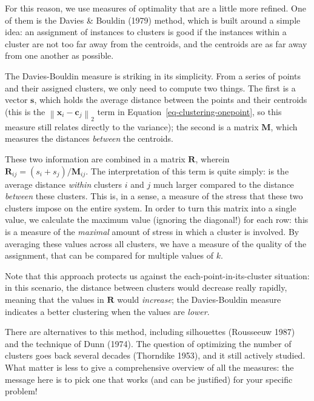 \documentclass[
  letterpaper,
]{scrbook}
\begin{document}
For this reason, we use measures of optimality that are a little more
refined. One of them is the Davies \& Bouldin (1979) method, which is
built around a simple idea: an assignment of instances to clusters is
good if the instances within a cluster are not too far away from the
centroids, and the centroids are as far away from one another as
possible.

The Davies-Bouldin measure is striking in its simplicity. From a series
of points and their assigned clusters, we only need to compute two
things. The first is a vector \(\mathbf{s}\), which holds the average
distance between the points and their centroids (this is the
\(\left\|\mathbf{x}_i-\mathbf{c}_j\right\|_2\) term in
Equation~\ref{eq-clustering-onepoint}, so this measure still relates
directly to the variance); the second is a matrix \(\mathbf{M}\), which
measures the distances \emph{between} the centroids.

These two information are combined in a matrix \(\mathbf{R}\), wherein
\(\mathbf{R}_{ij} = (s_i + s_j)/\mathbf{M}_{ij}\). The interpretation of
this term is quite simply: is the average distance \emph{within}
clusters \(i\) and \(j\) much larger compared to the distance
\emph{between} these clusters. This is, in a sense, a measure of the
stress that these two clusters impose on the entire system. In order to
turn this matrix into a single value, we calculate the maximum value
(ignoring the diagonal!) for each row: this is a measure of the
\emph{maximal} amount of stress in which a cluster is involved. By
averaging these values across all clusters, we have a measure of the
quality of the assignment, that can be compared for multiple values of
\(k\).

Note that this approach protects us against the
each-point-in-its-cluster situation: in this scenario, the distance
between clusters would decrease really rapidly, meaning that the values
in \(\mathbf{R}\) would \emph{increase}; the Davies-Bouldin measure
indicates a better clustering when the values are \emph{lower}.


There are alternatives to this method, including silhouettes (Rousseeuw
1987) and the technique of Dunn (1974). The question of optimizing the
number of clusters goes back several decades (Thorndike 1953), and it
still actively studied. What matter is less to give a comprehensive
overview of all the measures: the message here is to pick one that works
(and can be justified) for your specific problem!
\end{document}
